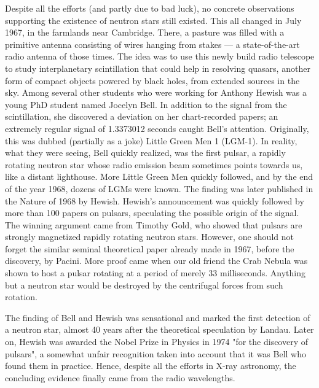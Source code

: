 Despite all the efforts (and partly due to bad luck), no concrete observations supporting the existence of neutron stars still existed.
This all changed in July 1967, in the farmlands near Cambridge.
There, a pasture was filled with a primitive antenna consisting of wires hanging from stakes --- a state-of-the-art radio antenna of those times.
The idea was to use this newly build radio telescope to study interplanetary scintillation that could help in resolving quasars, another form of compact objects powered by black holes, from extended sources in the sky.
Among several other students who were working for Anthony Hewish was a young PhD student named Jocelyn Bell.
In addition to the signal from the scintillation, she discovered a deviation on her chart-recorded papers; 
an extremely regular signal of 1.3373012 seconds caught Bell's attention.
Originally, this was dubbed (partially as a joke) Little Green Men 1 (LGM-1).
In reality, what they were seeing, Bell quickly realized, was the first pulsar, a rapidly rotating neutron star whose radio emission beam sometimes points towards us, like a distant lighthouse.
More Little Green Men quickly followed, and by the end of the year 1968, dozens of LGMs were known.
The finding was later published in the Nature of 1968 by Hewish.\cite{Hewish68}
Hewish's announcement was quickly followed by more than 100 papers on pulsars, speculating the possible origin of the signal.
The winning argument came from Timothy Gold, who showed that pulsars are strongly magnetized rapidly rotating neutron stars.\cite{Gold68}
However, one should not forget the similar seminal theoretical paper already made in 1967, before the discovery, by Pacini.\cite{Pacini67}
More proof came when our old friend the Crab Nebula was shown to host a pulsar rotating at a period of merely $33$ milliseconds.\cite{CCL69}
Anything but a neutron star would be destroyed by the centrifugal forces from such rotation.

The finding of Bell and Hewish was sensational and marked the first detection of a neutron star, almost 40 years after the theoretical speculation by Landau.
Later on, Hewish was awarded the Nobel Prize in Physics in 1974 "for the discovery of pulsars", a somewhat unfair recognition taken into account that it was Bell who found them in practice.
Hence, despite all the efforts in X-ray astronomy, the concluding evidence finally came from the radio wavelengths.


